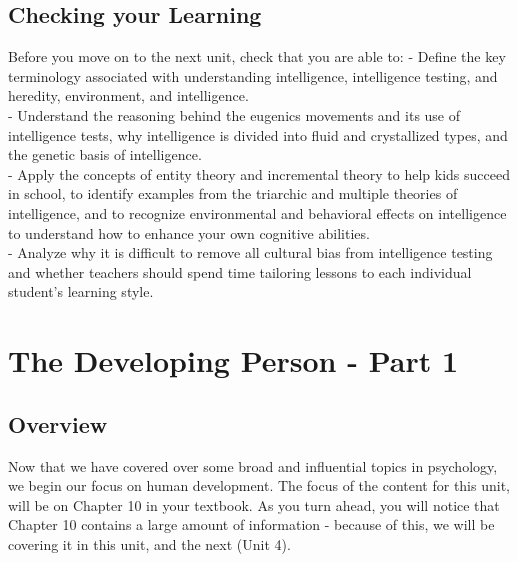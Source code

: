 \documentclass[
]{book}
\begin{document}
\hypertarget{checking-your-learning-1}{%
\section*{Checking your Learning}\label{checking-your-learning-1}}

\begin{progress}
Before you move on to the next unit, check that you are able to:
- Define the key terminology associated with understanding intelligence, intelligence testing, and heredity, environment, and intelligence.\\
- Understand the reasoning behind the eugenics movements and its use of intelligence tests, why intelligence is divided into fluid and crystallized types, and the genetic basis of intelligence.\\
- Apply the concepts of entity theory and incremental theory to help kids succeed in school, to identify examples from the triarchic and multiple theories of intelligence, and to recognize environmental and behavioral effects on intelligence to understand how to enhance your own cognitive abilities.\\
- Analyze why it is difficult to remove all cultural bias from intelligence testing and whether teachers should spend time tailoring lessons to each individual student's learning style.\\
\end{progress}

\hypertarget{the-developing-person---part-1}{%
\chapter{The Developing Person - Part 1}\label{the-developing-person---part-1}}

\hypertarget{overview-2}{%
\section*{Overview}\label{overview-2}}

Now that we have covered over some broad and influential topics in psychology, we begin our focus on human development. The focus of the content for this unit, will be on Chapter 10 in your textbook. As you turn ahead, you will notice that Chapter 10 contains a large amount of information - because of this, we will be covering it in this unit, and the next (Unit 4).
\end{document}
